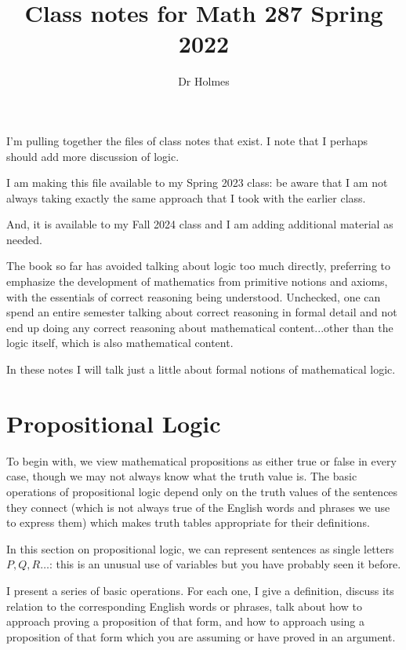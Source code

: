 \documentclass[12pt]{article}
\title{Class notes for Math 287 Spring 2022}
\author{Dr Holmes}
\begin{document}
\maketitle

I'm pulling together the files of class notes that exist.  I note that I perhaps should add more discussion of logic.

I am making this file available to my Spring 2023 class:  be aware that I am not always taking exactly the same approach that I took with the earlier class.

And, it is available to my Fall 2024 class and I am adding additional material as needed.

\tableofcontents

\newpage

The book so far has avoided talking about logic too much directly, preferring to emphasize the development of mathematics from primitive notions and axioms, with the essentials of correct reasoning being understood.  Unchecked, one can spend an entire semester talking about correct reasoning in formal detail and not end up doing any correct reasoning about mathematical content...other than the logic itself, which is also mathematical content.

In these notes I will talk just a little about formal notions of mathematical logic.

\section{Propositional Logic}

To begin with, we view mathematical propositions as either true or false in every case, though we may not always know what the truth value is.  The basic operations of propositional logic depend only on the truth values of the sentences they connect (which is not always true of the English words and phrases we use to express them) which makes truth tables appropriate for their definitions.

In this section on propositional logic, we can represent sentences as single letters $P,Q,R\ldots$:  this is an unusual use of variables but you have probably seen it before.

I present a series of basic operations.  For each one, I give a definition, discuss its relation to the corresponding English words or phrases, talk about how to approach proving a proposition of that form, and how to approach using a proposition of that form which you are assuming or have proved in an argument.
\end{document}
